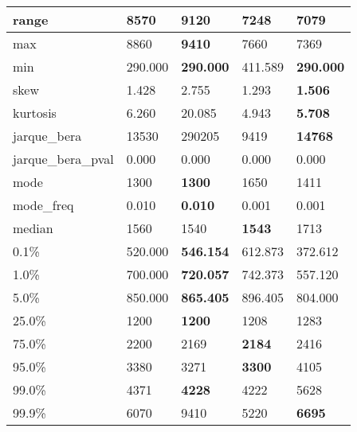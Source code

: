 \begin{table}[H]
\begin{tabular}{|l|m{10em}|m{10em}|m{10em}|m{10em}|}
\hline range & 8570 & \bfseries 9120 & 7248 & \cellcolor[rgb]{0.9, 0.54, 0.52} 7079 \\
\hline max & 8860 & \bfseries 9410 & 7660 & \cellcolor[rgb]{0.9, 0.54, 0.52} 7369 \\
\hline min & 290.000 & \bfseries 290.000 & \cellcolor[rgb]{0.9, 0.54, 0.52} 411.589 & \bfseries 290.000 \\
\hline skew & 1.428 & \cellcolor[rgb]{0.9, 0.54, 0.52} 2.755 & 1.293 & \bfseries 1.506 \\
\hline kurtosis & 6.260 & \cellcolor[rgb]{0.9, 0.54, 0.52} 20.085 & 4.943 & \bfseries 5.708 \\
\hline jarque\_bera & 13530 & \cellcolor[rgb]{0.9, 0.54, 0.52} 290205 & 9419 & \bfseries 14768 \\
\hline jarque\_bera\_pval & 0.000 & 0.000 & 0.000 & 0.000 \\
\hline mode & 1300 & \bfseries 1300 & \cellcolor[rgb]{0.9, 0.54, 0.52} 1650 & 1411 \\
\hline mode\_freq & 0.010 & \bfseries 0.010 & \cellcolor[rgb]{0.9, 0.54, 0.52} 0.001 & 0.001 \\
\hline median & 1560 & 1540 & \bfseries 1543 & \cellcolor[rgb]{0.9, 0.54, 0.52} 1713 \\
\hline 0.1\% & 520.000 & \bfseries 546.154 & 612.873 & \cellcolor[rgb]{0.9, 0.54, 0.52} 372.612 \\
\hline 1.0\% & 700.000 & \bfseries 720.057 & 742.373 & \cellcolor[rgb]{0.9, 0.54, 0.52} 557.120 \\
\hline 5.0\% & 850.000 & \bfseries 865.405 & \cellcolor[rgb]{0.9, 0.54, 0.52} 896.405 & 804.000 \\
\hline 25.0\% & 1200 & \bfseries 1200 & 1208 & \cellcolor[rgb]{0.9, 0.54, 0.52} 1283 \\
\hline 75.0\% & 2200 & 2169 & \bfseries 2184 & \cellcolor[rgb]{0.9, 0.54, 0.52} 2416 \\
\hline 95.0\% & 3380 & 3271 & \bfseries 3300 & \cellcolor[rgb]{0.9, 0.54, 0.52} 4105 \\
\hline 99.0\% & 4371 & \bfseries 4228 & 4222 & \cellcolor[rgb]{0.9, 0.54, 0.52} 5628 \\
\hline 99.9\% & 6070 & \cellcolor[rgb]{0.9, 0.54, 0.52} 9410 & 5220 & \bfseries 6695 \\
\hline
\end{tabular}
\end{table}
